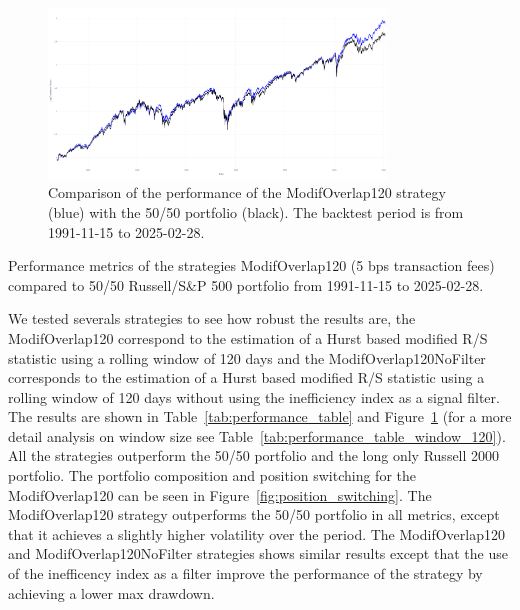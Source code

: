 \documentclass[11pt]{extarticle}
\begin{document}
\begin{figure}[ht]
    \centering
    \includegraphics[width=0.8\textwidth]{img/backtest_long_neutral.png}
    \caption{Comparison of the performance of the ModifOverlap120 strategy (blue) with the 50/50 portfolio (black).
        The backtest period is from 1991-11-15 to 2025-02-28.}
    \label{fig:cumulative_performance}
\end{figure}

\FloatBarrier

\begin{table}[!h]
    \centering
    \caption{Performance metrics of the strategies ModifOverlap120 (5 bps transaction fees) compared to 50/50 Russell/S\&P 500 portfolio
    from 1991-11-15 to 2025-02-28.}
    \label{tab:performance_table}
\end{table}

\FloatBarrier

\label{sec:backtest_results}
We tested severals strategies to see how robust the results are, the ModifOverlap120 correspond to the estimation of a
Hurst based modified R/S statistic using a rolling window of 120 days and the ModifOverlap120NoFilter corresponds to the estimation of a
Hurst based modified R/S statistic using a rolling window of 120 days without using the inefficiency index as a signal filter.
The results are shown in Table~\ref{tab:performance_table} and Figure~\ref{fig:cumulative_performance} (for a more detail analysis
on window size see Table~\ref{tab:performance_table_window_120}).
All the strategies outperform the 50/50 portfolio and the long only Russell 2000 portfolio. The portfolio composition and position switching
for the ModifOverlap120 can be seen in Figure~\ref{fig:position_switching}.
The ModifOverlap120 strategy outperforms the 50/50 portfolio in all metrics, except
that it achieves a slightly higher volatility over the period. The ModifOverlap120 and ModifOverlap120NoFilter strategies
shows similar results except that the use of the inefficency index as a filter improve the performance of the strategy by
achieving a lower max drawdown.
\end{document}
